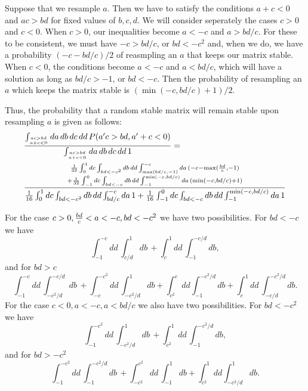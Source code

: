 \documentclass{amsart}
\theoremstyle{definition}
\theoremstyle{remark}
\numberwithin{equation}{section}
\begin{document}

Suppose that we resample $a$.  Then we have to satisfy the conditions
$a + c < 0$ and $ac > bd$ for fixed values of $b,c,d$.  We will
consider seperately the cases $c > 0$ and $c < 0$.  When $c > 0$, our
inequalities become $a < -c$ and $a > bd/c$.  For these to be
consistent, we must have $-c > bd/c$, or $bd < -c^2$ and, when we do,
we have a probability $(-c-bd/c)/2$ of reasmpling an $a$ that keeps
our matrix stable.  When $c < 0$, the conditions become $a < -c$ and
$a < bd/c$, which will have a solution as long as $bd/c > -1$, or $bd
< -c$.  Then the probability of resampling an $a$ which keeps the
matrix stable is $(\min(-c, bd/c) + 1)/2$.

Thus, the probability that a random stable matrix will remain stable upon resampling $a$ is given as follows:
\begin{align*}
&\frac{\int_{ac>bd \atop a+c<0} da\,db\,dc\,dd\,
  P(a'c>bd, a'+c < 0)}{\int_{ac>bd \atop a+c<0} da\,db\,dc\,dd\,1} = \\
&\frac{\genfrac{}{}{0pt}{}{{1 \over 32} \int_0^1 dc \int_{bd < -c^2} db\,dd \int_{\max(bd/c,-1)}^{-c} da \,
(-c - \max({bd \over c},-1)}{+
{1 \over 32} \int_{-1}^0 dc \int_{bd < -c} db\,dd \int_{-1}^{\min(-c,
bd/c)} da\, (\min(-c, bd/c) + 1)}}{{1 \over 16} \int_0^1 dc \int_{bd < -c^2} db\,dd \int_{bd/c}^{-c} da\,1
+
{1 \over 16} \int_{-1}^0 dc \int_{bd < -c} db\,dd \int_{-1}^{\min(-c, bd/c)} da\,1}
\end{align*}

For the case $c>0, {bd \over c} < a < -c, bd < -c^2$ we have two possibilities. For $bd < -c$ we have
$$
\int_{-1}^{-c} dd\, \int_{c/d}^1 db\, + \int_c^1 dd\, \int_{-1}^{-c/d} db,
$$
and for $bd > c$
$$
\int_{-1}^{-c} dd\, \int_{-c^2/d}^{-c/d} db\, + \int_{-c}^{-c^2} dd\, \int_{-c^2/d}^{1} db +
\int_{c^2}^{c} dd \int_{-1}^{-c^2/d} db +
\int_{c}^{1}dd\,\int_{-c/d}^{-c^2/d}db.
$$
For the case $c < 0, a < -c, a < bd/c$ we also have two possibilities. For $bd < -c^2$ we have
$$
\int_{-1}^{-c^2} dd\, \int_{-c^2/d}^1 db\, + \int_{c^2}^1 dd\, \int_{-1}^{-c^2/d} db,
$$
and for $bd > -c^2$
$$
\int_{-1}^{-c^2} dd\, \int_{-1}^{-c^2/d} db\, + \int_{-c^2}^{c^2} dd\, \int_{-1}^{1} db + 
\int_{c^2}^{1} dd \int_{-c^2/d}^{1} db.
$$
\end{document}
